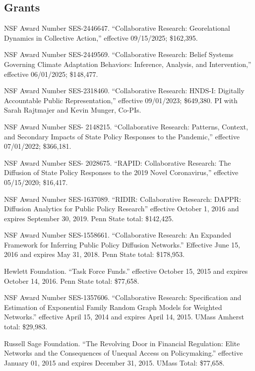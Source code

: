 \documentclass[overlapped,line]{res}
\begin{document}
\begin{resume}


\renewcommand{\labelitemi}{\bf --}

\section{\bf Grants}
\begin{etaremune}
\item NSF Award Number SES-2446647. ``Collaborative Research: Georelational Dynamics in Collective Action,'' effective 09/15/2025; \$162,395.
\item NSF Award Number SES-2449569. ``Collaborative Research: Belief Systems Governing Climate Adaptation Behaviors: Inference, Analysis, and Intervention,'' effective 06/01/2025; \$148,477.
\item NSF Award Number SES-2318460. ``Collaborative Research: HNDS-I: Digitally Accountable Public Representation,'' effective 09/01/2023; \$649,380.  PI with Sarah Rajtmajer and Kevin Munger, Co-PIs.
\item NSF Award Number SES- 2148215. ``Collaborative Research: Patterns, Context, and Secondary Impacts of State Policy Responses to the Pandemic,'' effective 07/01/2022; \$366,181.
\item NSF Award Number SES- 2028675. ``RAPID: Collaborative Research: The Diffusion of State Policy Responses to the 2019 Novel Coronavirus,'' effective 05/15/2020; \$16,417.
 \item NSF Award Number SES-1637089. ``RIDIR: Collaborative Research: DAPPR: Diffusion Analytics for Public Policy Research'' effective October 1, 2016 and expires September 30, 2019.  Penn State total: \$142,425.
 \item NSF Award Number SES-1558661. ``Collaborative Research: An Expanded Framework for Inferring Public Policy Diffusion Networks.'' Effective June 15, 2016 and expires May 31, 2018. Penn State total: \$178,953.
  \item Hewlett Foundation. ``Task Force Funds.'' effective October 15, 2015 and expires October 14, 2016. Penn State total: \$77,658.
 \item NSF Award Number SES-1357606. ``Collaborative Research: Specification and Estimation of Exponential Family Random Graph Models for Weighted Networks.'' effective April 15, 2014 and expires April 14, 2015.  UMass Amherst total: \$29,983.
 \item Russell Sage Foundation. ``The Revolving Door in Financial Regulation: Elite Networks and the Consequences of Unequal Access on Policymaking.'' effective January 01, 2015 and expires December 31, 2015. UMass Total: \$77,658.

\end{etaremune}
\end{resume}
\end{document}
